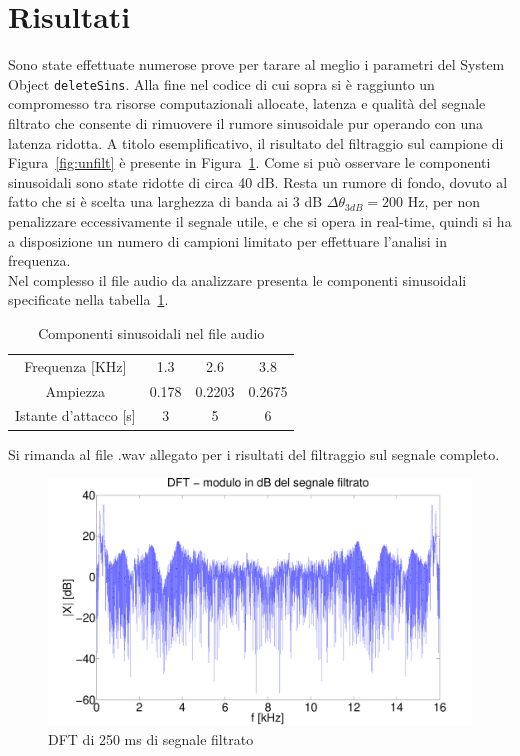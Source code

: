\documentclass[10pt,A4]{article}
\begin{document}
\section{Risultati}
Sono state effettuate numerose prove per tarare al meglio i parametri del System Object \texttt{deleteSins}. Alla fine nel codice di cui sopra si è raggiunto un compromesso tra risorse computazionali allocate, latenza e qualità del segnale filtrato che consente di rimuovere il rumore sinusoidale pur operando con una latenza ridotta. A titolo esemplificativo, il risultato del filtraggio sul campione di Figura~\ref{fig:unfilt} è presente in Figura~\ref{fig:filt}. Come si può osservare le componenti sinusoidali sono state ridotte di circa 40 dB. Resta un rumore di fondo, dovuto al fatto che si è scelta una larghezza di banda ai 3 dB $\Delta\theta_{3dB} = 200$ Hz, per non penalizzare eccessivamente il segnale utile, e che si opera in real-time, quindi si ha a disposizione un numero di campioni limitato per effettuare l'analisi in frequenza. \\
Nel complesso il file audio da analizzare presenta le componenti sinusoidali specificate nella tabella~\ref{table:sins}.

\begin{table}[h]
  \centering
  \begin{tabular}{|c|c|c|c|}
    Frequenza [KHz]        & 1.3      &  2.6    &  3.8 \\
    Ampiezza               & 0.178    & 0.2203  & 0.2675  \\
    Istante d'attacco [s]  & 3        & 5       & 6  \\
  \end{tabular}
  \caption{Componenti sinusoidali nel file audio}
  \label{table:sins}
\end{table}
\flushleft
Si rimanda al file .wav allegato per i risultati del filtraggio sul segnale completo.

\begin{figure}[h]
  \centering
  \includegraphics[width = 1\textwidth, keepaspectratio]{images/DFTdBFiltered.pdf}
  \caption{DFT di 250 ms di segnale filtrato}
  \label{fig:filt}
\end{figure}
\end{document}
